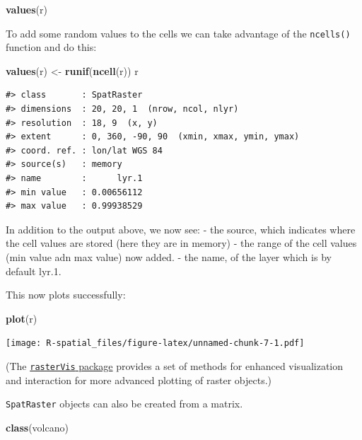 \documentclass[
]{book}
\newenvironment{Shaded}{\begin{snugshade}}{\end{snugshade}}
\newcommand{\FunctionTok}[1]{\textcolor[rgb]{0.13,0.29,0.53}{\textbf{#1}}}
\newcommand{\NormalTok}[1]{#1}
\newcommand{\OtherTok}[1]{\textcolor[rgb]{0.56,0.35,0.01}{#1}}
\begin{document}
\begin{Shaded}
\begin{Highlighting}[]
\FunctionTok{values}\NormalTok{(r)}
\end{Highlighting}
\end{Shaded}

To add some random values to the cells we can take advantage of the \texttt{ncells()} function and do this:

\begin{Shaded}
\begin{Highlighting}[]
\FunctionTok{values}\NormalTok{(r) }\OtherTok{\textless{}{-}} \FunctionTok{runif}\NormalTok{(}\FunctionTok{ncell}\NormalTok{(r))}
\NormalTok{r }
\end{Highlighting}
\end{Shaded}

\begin{verbatim}
#> class       : SpatRaster 
#> dimensions  : 20, 20, 1  (nrow, ncol, nlyr)
#> resolution  : 18, 9  (x, y)
#> extent      : 0, 360, -90, 90  (xmin, xmax, ymin, ymax)
#> coord. ref. : lon/lat WGS 84 
#> source(s)   : memory
#> name        :      lyr.1 
#> min value   : 0.00656112 
#> max value   : 0.99938529
\end{verbatim}

In addition to the output above, we now see:
- the source, which indicates where the cell values are stored (here they are in memory)
- the range of the cell values (min value adn max value) now added.
- the name, of the layer which is by default lyr.1.

This now plots successfully:

\begin{Shaded}
\begin{Highlighting}[]
\FunctionTok{plot}\NormalTok{(r)}
\end{Highlighting}
\end{Shaded}

\texttt{[image: R-spatial\_files/figure-latex/unnamed-chunk-7-1.pdf]}

(The \href{https://cran.r-project.org/web/packages/rasterVis/index.html}{\texttt{rasterVis} package} provides a set of methods for enhanced visualization and interaction for more advanced plotting of raster objects.)

\texttt{SpatRaster} objects can also be created from a matrix.

\begin{Shaded}
\begin{Highlighting}[]
\FunctionTok{class}\NormalTok{(volcano)}
\end{Highlighting}
\end{Shaded}
\end{document}
